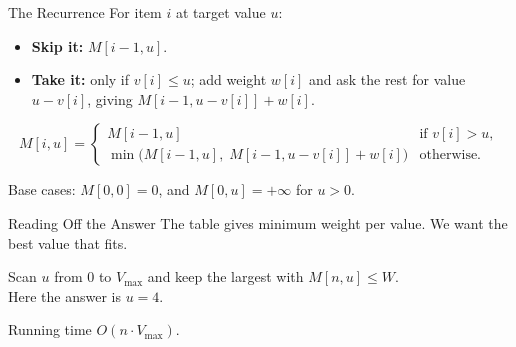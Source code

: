 \documentclass[10pt,aspectratio=169]{beamer}
\begin{document}
\begin{frame}{The Recurrence}
  For item $i$ at target value $u$:

  \begin{itemize}
    \item \textbf{Skip it:} $M[i-1, u]$.
    \pause
    \item \textbf{Take it:} only if $v[i] \le u$; add weight $w[i]$ and ask the
          rest for value $u - v[i]$, giving $M[i-1, u - v[i]] + w[i]$.
  \end{itemize}

  \pause
  \bigskip
  \begin{alertblock}{}
    \[
      M[i,u] = \begin{cases}
        M[i-1,u] & \text{if } v[i] > u, \\[0.3em]
        \min\big( M[i-1,u],\; M[i-1, u-v[i]] + w[i] \big) & \text{otherwise.}
      \end{cases}
    \]
  \end{alertblock}

  \bigskip
  Base cases: $M[0,0] = 0$, and $M[0,u] = +\infty$ for $u > 0$.
\end{frame}

\begin{frame}{Reading Off the Answer}
  The table gives minimum weight per value. We want the best value that
  \alert{fits}.

  \bigskip
  \begin{center}
  \end{center}

  \bigskip
  \begin{center}
    Scan $u$ from $0$ to $V_{\max}$ and keep the largest with $M[n,u] \le W$.\\
    \smallskip
    Here the answer is $u = 4$.
  \end{center}

  \bigskip
  \begin{center}
    Running time $O(n \cdot V_{\max})$.
  \end{center}
\end{frame}
\end{document}
